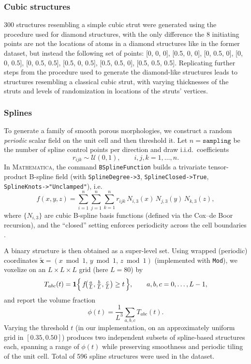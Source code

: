 \subsubsection{Cubic structures}

300 structures resembling a simple cubic strut were generated using the procedure used for diamond structures, with the only difference the 8 initiating points are not the locations of atoms in a diamond structures like in the former dataset, but instead the following set of points: [0, 0, 0],
        [0.5, 0, 0],
        [0, 0.5, 0],
        [0, 0, 0.5],
        [0, 0.5, 0.5],
        [0.5, 0, 0.5],
        [0.5, 0.5, 0],
        [0.5, 0.5, 0.5]. Replicating further steps from the procedure used to generate the diamond-like structures leads to structures resembling a classical cubic strut, with varying thicknesses of the struts and levels of randomization in locations of the struts' vertices. 


\subsubsection{Splines}

To generate a family of smooth porous morphologies, we construct a random \emph{periodic} scalar field on the unit cell and then threshold it.
Let $n=\texttt{sampling}$ be the number of spline control points per direction and draw i.i.d.\ coefficients
\begin{equation}
r_{ijk}\sim\mathcal U(0,1),\qquad i,j,k=1,\dots,n .
\end{equation}
In \textsc{Mathematica}, the command
\texttt{BSplineFunction} builds a trivariate tensor-product B-spline field
(with \texttt{SplineDegree->3}, \texttt{SplineClosed->True}, \texttt{SplineKnots->"Unclamped"}), i.e.
\begin{equation}
f(x,y,z)=\sum_{i=1}^{n}\sum_{j=1}^{n}\sum_{k=1}^{n}
r_{ijk}\,N_{i,3}(x)\,N_{j,3}(y)\,N_{k,3}(z),
\label{eq:spline_field}
\end{equation}
where $\{N_{i,3}\}$ are cubic B-spline basis functions (defined via the Cox--de Boor recursion), and the ``closed'' setting enforces periodicity across the cell boundaries \cite{deBoor1978,wolframBSplineFunction}.

A binary structure is then obtained as a super-level set. Using wrapped (periodic) coordinates
$\tilde{\boldsymbol{x}}=(x\bmod 1,\,y\bmod 1,\,z\bmod 1)$ (implemented with \texttt{Mod}), we voxelize on an $L\times L\times L$ grid (here $L=80$) by
\begin{equation}
T_{abc}(t)=\mathbf{1}\Bigl\{\,f\!\bigl(\tfrac{a}{L},\tfrac{b}{L},\tfrac{c}{L}\bigr)\ge t\,\Bigr\},
\qquad a,b,c=0,\dots,L-1,
\label{eq:thresholding}
\end{equation}
and report the volume fraction
\begin{equation}
\phi(t)=\frac{1}{L^{3}}\sum_{a,b,c} T_{abc}(t).
\end{equation}
Varying the threshold $t$ (in our implementation, on an approximately uniform grid in $[0.35,0.50]$) produces two independent subsets of spline-based structures each, spanning a range of $\phi(t)$ while preserving smoothness and periodic tiling of the unit cell.
Total of 596 spline structures were used in the dataset.

